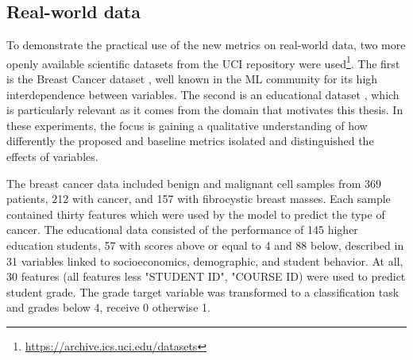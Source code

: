 \subsection{Real-world data}
\label{sec:realWolrldData}

To demonstrate the practical use of the new metrics on real-world data, two more openly available scientific datasets from the \gls{UCI} repository were used\footnote{\url{https://archive.ics.uci.edu/datasets}}. The first is the Breast Cancer dataset \cite{Dua:2019}, well known in the ML community for its high interdependence between variables. The second is an educational dataset \cite{Ylmaz2020StudentTechniques}, which is particularly relevant as it comes from the domain that motivates this thesis. In these experiments, the focus is gaining a qualitative understanding of how differently the proposed and baseline metrics isolated and distinguished the effects of variables. 

The breast cancer data included benign and malignant cell samples from 369 patients, 212 with cancer, and 157 with fibrocystic breast masses. Each sample contained thirty features which were used by the model to predict the type of cancer. The educational data consisted of the performance of 145 higher education students, 57 with scores above or equal to 4 and 88 below, described in 31 variables linked to socioeconomics, demographic, and student behavior. At all, 30 features (all features less "STUDENT ID", "COURSE ID) were used to predict student grade. The grade target variable was transformed to a classification task and grades below 4, receive 0 otherwise 1.




